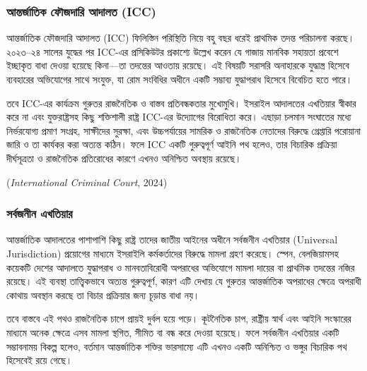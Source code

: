 \subsubsection{আন্তর্জাতিক ফৌজদারি আদালত
(ICC)}\label{ux986ux9a8ux9a4ux9b0ux99cux9a4ux995-ux9abux99cux9a6ux9b0-ux986ux9a6ux9b2ux9a4-icc}

আন্তর্জাতিক ফৌজদারি আদালত (ICC) ফিলিস্তিন পরিস্থিতি নিয়ে বহু বছর ধরেই প্রাথমিক
তদন্ত পরিচালনা করছে। ২০২৩--২৪ সালের যুদ্ধের পর ICC-এর প্রসিকিউটর প্রকাশ্যে
উল্লেখ করেন যে গাজায় মানবিক সহায়তা প্রবেশে ইচ্ছাকৃত বাধা দেওয়া হয়েছে
কিনা---তা তদন্তের আওতায় রয়েছে। এই বিষয়টি সরাসরি অনাহারকে যুদ্ধাস্ত্র হিসেবে
ব্যবহারের অভিযোগের সাথে সংযুক্ত, যা রোম সংবিধির অধীনে একটি সম্ভাব্য যুদ্ধাপরাধ
হিসেবে বিবেচিত হতে পারে।

তবে ICC-এর কার্যক্রম গুরুতর রাজনৈতিক ও বাস্তব প্রতিবন্ধকতার মুখোমুখি। ইসরাইল
আদালতের এখতিয়ার স্বীকার করে না এবং যুক্তরাষ্ট্রসহ কিছু শক্তিশালী রাষ্ট্র ICC-এর
উদ্যোগের বিরোধিতা করে। এছাড়া চলমান সংঘাতের মধ্যে নির্ভরযোগ্য প্রমাণ সংগ্রহ,
সাক্ষীদের সুরক্ষা, এবং উচ্চপর্যায়ের সামরিক ও রাজনৈতিক নেতাদের বিরুদ্ধে গ্রেপ্তারি
পরোয়ানা জারি ও তা কার্যকর করা অত্যন্ত কঠিন। ফলে ICC একটি গুরুত্বপূর্ণ আইনি পথ
হলেও, তার বিচারিক প্রক্রিয়া দীর্ঘসূত্রতা ও রাজনৈতিক প্রতিরোধের কারণে এখনও
অনিশ্চিত অবস্থায় রয়েছে।

(\emph{International Criminal Court}, 2024)

\vspace{0.3em}

\subsubsection{সর্বজনীন এখতিয়ার}\label{ux9b8ux9b0ux9acux99cux9a8ux9a8-ux98fux996ux9a4ux9dfux9b0-universal-jurisdiction}

আন্তর্জাতিক আদালতের পাশাপাশি কিছু রাষ্ট্র তাদের জাতীয় আইনের অধীনে সর্বজনীন
এখতিয়ার (Universal Jurisdiction) প্রয়োগের মাধ্যমে ইসরাইলি কর্মকর্তাদের
বিরুদ্ধে মামলা গ্রহণ করেছে। স্পেন, বেলজিয়ামসহ কয়েকটি দেশের আদালতে যুদ্ধাপরাধ ও
মানবতাবিরোধী অপরাধের অভিযোগে মামলা দায়ের বা প্রাথমিক তদন্তের নজির রয়েছে।
এই ব্যবস্থা তাত্ত্বিকভাবে অত্যন্ত গুরুত্বপূর্ণ, কারণ এটি দেখায় যে গুরুতর আন্তর্জাতিক
অপরাধের ক্ষেত্রে অপরাধী কোথায় অবস্থান করছে তা বিচার প্রক্রিয়ার জন্য চূড়ান্ত বাধা
নয়।

তবে বাস্তবে এই পথও রাজনৈতিক চাপে প্রায়ই দুর্বল হয়ে পড়ে। কূটনৈতিক চাপ, রাষ্ট্রীয়
স্বার্থ এবং আইনি সংস্কারের মাধ্যমে অনেক ক্ষেত্রে এসব মামলা স্থগিত, সীমিত বা বন্ধ
করে দেওয়া হয়েছে। ফলে সর্বজনীন এখতিয়ার একটি সম্ভাবনাময় বিকল্প হলেও, বর্তমান
আন্তর্জাতিক শক্তির ভারসাম্যে এটি এখনও একটি অনিশ্চিত ও ভঙ্গুর বিচারিক পথ হিসেবেই
রয়ে গেছে।

